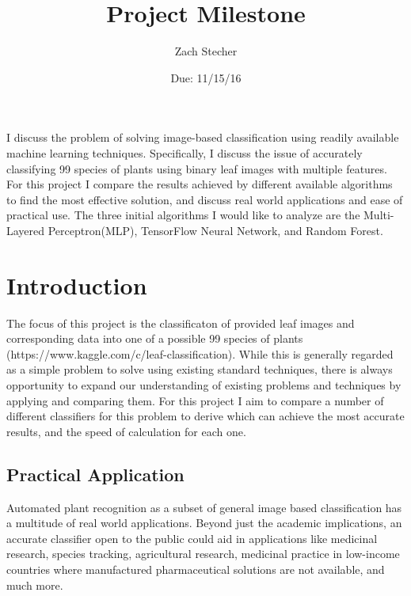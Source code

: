 \documentclass[12pt]{article}
\title{Project Milestone}
\author{Zach Stecher}
\date{Due: 11/15/16}
\begin{document}
\maketitle

\section*{}

I discuss the problem of solving image-based classification using readily available machine learning techniques. Specifically, I discuss the issue of accurately classifying 99 species of plants using binary leaf images with multiple features. For this project I compare the results achieved by different available algorithms to find the most effective solution, and discuss real world applications and ease of practical use. The three initial algorithms I would like to analyze are the Multi-Layered Perceptron(MLP), TensorFlow Neural Network, and Random Forest.

\section{Introduction}

The focus of this project is the classificaton of provided leaf images and corresponding data into one of a possible 99 species of plants (https://www.kaggle.com/c/leaf-classification). While this is generally regarded as a simple problem to solve using existing standard techniques, there is always opportunity to expand our understanding of existing problems and techniques by applying and comparing them. For this project I aim to compare a number of different classifiers for this problem to derive which can achieve the most accurate results, and the speed of calculation for each one.

\subsection{Practical Application}

Automated plant recognition as a subset of general image based classification has a multitude of real world applications. Beyond just the academic implications, an accurate classifier open to the public could aid in applications like medicinal research, species tracking, agricultural research, medicinal practice in low-income countries where manufactured pharmaceutical solutions are not available, and much more.

\subsection{}
\end{document}
